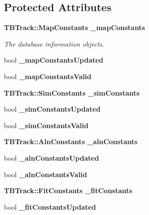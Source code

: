\subsection*{Protected Attributes}
\begin{DoxyCompactItemize}
\item 
{\bf TBTrack::MapConstants} {\bf \_\-mapConstants}\label{classTBTrackBaseProcessor_aa3c3920945b6b96403927e68a4f2d597}

\begin{DoxyCompactList}\small\item\em The database information objects. \item\end{DoxyCompactList}\item 
bool {\bfseries \_\-mapConstantsUpdated}\label{classTBTrackBaseProcessor_ac2ee432d8acdab0d231ae0b58f5d6e4b}

\item 
bool {\bfseries \_\-mapConstantsValid}\label{classTBTrackBaseProcessor_ad88c3ed8dec6a87ff3a3eb028dbe2236}

\item 
{\bf TBTrack::SimConstants} {\bfseries \_\-simConstants}\label{classTBTrackBaseProcessor_aaeccc8a3856c961bfb3a2e4628b18bd5}

\item 
bool {\bfseries \_\-simConstantsUpdated}\label{classTBTrackBaseProcessor_afdb74aa9289c530800aa1d7c59501d76}

\item 
bool {\bfseries \_\-simConstantsValid}\label{classTBTrackBaseProcessor_a8fb586fb8ea61ce5ec517eedc58e2f20}

\item 
{\bf TBTrack::AlnConstants} {\bfseries \_\-alnConstants}\label{classTBTrackBaseProcessor_a294488d1364906fcd0c8f5ef18c014d0}

\item 
bool {\bfseries \_\-alnConstantsUpdated}\label{classTBTrackBaseProcessor_a42d1d55d0287df992de23ea462f85220}

\item 
bool {\bfseries \_\-alnConstantsValid}\label{classTBTrackBaseProcessor_a6e3b2ecf65ac15db4090a2c6c1b93f33}

\item 
{\bf TBTrack::FitConstants} {\bfseries \_\-fitConstants}\label{classTBTrackBaseProcessor_a36bd2bc7a54a8e8d2d19f03bb957a3d6}

\item 
bool {\bfseries \_\-fitConstantsUpdated}\label{classTBTrackBaseProcessor_a4b8278fd1ed9ff91f0a476cd84cdbce1}


\end{DoxyCompactItemize}
